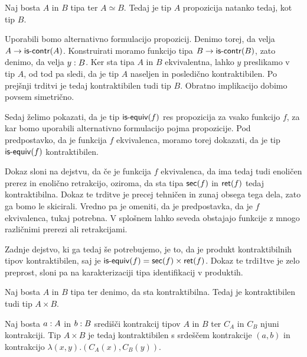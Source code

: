 \begin{trditev}
  \label{equiv-preserves-prop}
  Naj bosta \(A\) in \(B\) tipa ter \(A \simeq B\). Tedaj je tip \(A\) propozicija natanko tedaj, kot tip \(B\).
\end{trditev}

\begin{dokaz}
  Uporabili bomo alternativno formulacijo propozicij. Denimo torej, da velja \(A \to \textnormal{\textsf{is-contr}}(A)\). Konstruirati moramo funkcijo tipa \(B \to \textnormal{\textsf{is-contr}}(B)\), zato denimo, da velja \(y : B\). Ker sta tipa \(A\) in \(B\) ekvivalentna, lahko \(y\) preslikamo v tip \(A\), od tod pa sledi, da je tip \(A\) naseljen in posledično kontraktibilen. Po prejšnji trditvi je tedaj kontraktibilen tudi tip \(B\).
  Obratno implikacijo dobimo povsem simetrično.
\end{dokaz}

Sedaj želimo pokazati, da je tip \(\textnormal{\textsf{is-equiv}}(f)\) res propozicija za vsako funkcijo \(f\), za kar bomo uporabili alternativno formulacijo pojma propozicije. Pod predpostavko, da je funkcija \(f\) ekvivalenca, moramo torej dokazati, da je tip \(\textnormal{\textsf{is-equiv}}(f)\) kontraktibilen.

Dokaz sloni na dejstvu, da če je funkcija \(f\) ekvivalenca, da ima tedaj tudi enoličen prerez in enolično retrakcijo, oziroma, da sta tipa \(\textnormal{\textsf{sec}}(f)\) in \(\textnormal{\textsf{ret}}(f)\) tedaj kontraktibilna.
Dokaz te trditve je precej tehničen in zunaj obsega tega dela, zato ga bomo le skicirali. Vredno pa je omeniti, da je predpostavka, da je \(f\) ekvivalenca, tukaj potrebna. V splošnem lahko seveda obstajajo funkcije z mnogo različnimi prerezi ali retrakcijami.

Zadnje dejstvo, ki ga tedaj še potrebujemo, je to, da je produkt kontraktibilnih tipov kontraktibilen, saj je \(\textnormal{\textsf{is-equiv}}(f) = \textnormal{\textsf{sec}}(f) \times \textnormal{\textsf{ret}}(f)\). Dokaz te trdi1tve je zelo preprost, sloni pa na karakterizaciji tipa identifikacij v produktih.

\begin{trditev}
  Naj bosta \(A\) in \(B\) tipa ter denimo, da sta kontraktibilna. Tedaj je kontraktibilen tudi tip \(A \times B\).
\end{trditev}

\begin{dokaz}
  Naj bosta \(a : A\) in \(b : B\) središči kontrakcij tipov \(A\) in \(B\) ter \(C_{A}\) in \(C_{B}\) njuni kontrakciji. Tip \(A \times B\) je tedaj kontraktibilen s srdeščem kontrakcije \((a, b)\) in kontrakcijo \(\lambda(x, y).(C_{A}(x), C_{B}(y))\).
\end{dokaz}

